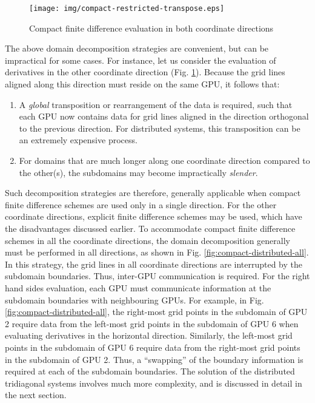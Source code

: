 \begin{figure}
\begin{center}
\texttt{[image: img/compact-restricted-transpose.eps]}
\caption{Compact finite difference evaluation in both coordinate directions}
\label{fig:compact-restricted-transpose}
\end{center}
\end{figure}

The above domain decomposition strategies are convenient,
but can be impractical for some cases.
For instance,
let us consider the evaluation of derivatives
in the other coordinate direction
(Fig. \ref{fig:compact-restricted-transpose}).
Because the grid lines aligned along this direction
must reside on the same GPU,
it follows that:
%
\begin{enumerate}
\item A \emph{global} transposition or rearrangement
    of the data is required,
    such that each GPU now contains data for
    grid lines aligned in the direction orthogonal
    to the previous direction.
    For distributed systems,
    this transposition can be an extremely expensive process.

\item For domains that are much longer along one coordinate
    direction compared to the other(s),
    the subdomains may become impractically \emph{slender}.
\end{enumerate}
%
Such decomposition strategies are therefore, generally applicable
when compact finite difference schemes are used only
in a single direction.
For the other coordinate directions,
explicit finite difference schemes may be used,
which have the disadvantages discussed earlier.
To accommodate compact finite difference schemes in all the coordinate
directions,
the domain decomposition generally must be performed in all directions,
as shown in Fig. \ref{fig:compact-distributed-all}.
In this strategy,
the grid lines in all coordinate directions
are interrupted by the subdomain boundaries.
Thus,
inter-GPU communication is required.
For the right hand sides evaluation,
each GPU must communicate information at the subdomain boundaries
with neighbouring GPUs.
For example, in Fig. \ref{fig:compact-distributed-all},
the right-most grid points in the subdomain of
GPU 2 require data from the
left-most grid points in the subdomain of
GPU 6 when evaluating derivatives in the horizontal direction.
Similarly,
the left-most grid points in the subdomain of
GPU 6 require data from the
right-most grid points in the subdomain of
GPU 2.
Thus, a ``swapping'' of the boundary information
is required at each of the subdomain boundaries.
The solution of the distributed tridiagonal systems
involves much more complexity,
and is discussed in detail in the next section.

